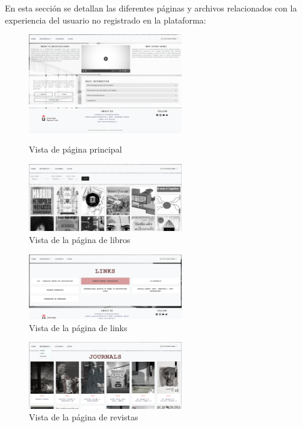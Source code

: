 \documentclass[a4paper, 12pt]{book}
\begin{document}
En esta sección se detallan las diferentes páginas y archivos relacionados con la experiencia del usuario no registrado en la plataforma:
\begin{figure}
  \centering
  \includegraphics[width=0.6\textwidth]{img/sitio1.png}
  \includegraphics[width=0.6\textwidth]{img/sitiopie.png}
  \caption{Vista de página principal}
  \label{fig:sitioindex}
\end{figure}
\begin{figure}
  \centering
  \includegraphics[width=0.6\textwidth]{img/booksitio.png}
  \caption{Vista de la página de libros}
  \label{fig:sitiobooks}
\end{figure}
\begin{figure}
  \centering
  \includegraphics[width=0.6\textwidth]{img/linksitio.png}
  \caption{Vista de la página de links}
  \label{fig:sitiolinks}
\end{figure}

\begin{figure}
  \centering
  \includegraphics[width=0.6\textwidth]{img/revistassitio.png}
  \caption{Vista de la página de revistas}
  \label{fig:sitiojournals}
\end{figure}
\end{document}
